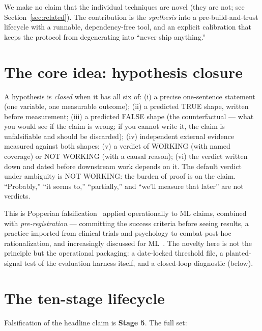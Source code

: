 \documentclass[11pt]{article}
\begin{document}
We make no claim that the individual techniques are novel (they are not; see
Section~\ref{sec:related}). The contribution is the \emph{synthesis} into a pre-build-and-trust
lifecycle with a runnable, dependency-free tool, and an explicit calibration that keeps the protocol
from degenerating into ``never ship anything.''

\section{The core idea: hypothesis closure}

A hypothesis is \emph{closed} when it has all six of: (i) a precise one-sentence statement (one
variable, one measurable outcome); (ii) a predicted TRUE shape, written before measurement; (iii) a
predicted FALSE shape (the counterfactual --- what you would see if the claim is wrong; if you cannot
write it, the claim is unfalsifiable and should be discarded); (iv) independent external evidence
measured against both shapes; (v) a verdict of WORKING (with named coverage) or NOT WORKING (with a
causal reason); (vi) the verdict written down and dated before downstream work depends on it. The
default verdict under ambiguity is NOT WORKING: the burden of proof is on the claim. ``Probably,''
``it seems to,'' ``partially,'' and ``we'll measure that later'' are not verdicts.

This is Popperian falsification~\cite{popper1959} applied operationally to ML claims, combined with
\emph{pre-registration} --- committing the success criteria before seeing results, a practice
imported from clinical trials and psychology to combat post-hoc rationalization, and increasingly
discussed for ML~\cite{prereg2020}. The novelty here is not the principle but the operational
packaging: a date-locked threshold file, a planted-signal test of the evaluation harness itself, and
a closed-loop diagnostic (below).

\section{The ten-stage lifecycle}

Falsification of the headline claim is \textbf{Stage 5}. The full set:
\end{document}
